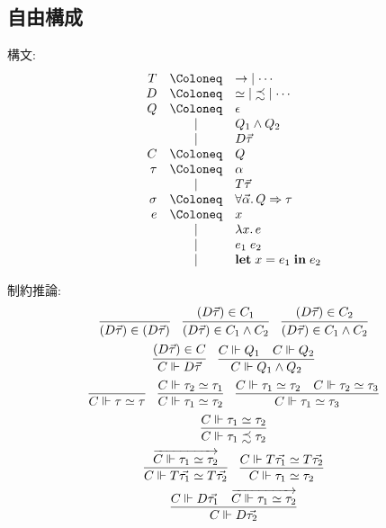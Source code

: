 \subsection{自由構成}

構文:
\begin{align*}
  \begin{array}{rcl}
    T
    &\Coloneq &{\to} \mid \cdots \\
    D
    &\Coloneq &{\simeq} \mid {\precsim} \mid \cdots \\
    Q
    &\Coloneq &\epsilon \\
    &\mid &Q_1 \land Q_2 \\
    &\mid &D \vec{\tau} \\
    C
    &\Coloneq &Q \\
    \tau
    &\Coloneq &\alpha \\
    &\mid &T \vec{\tau} \\
    \sigma
    &\Coloneq &\forall \vec{\alpha}\ldotp Q \Rightarrow \tau \\
    e
    &\Coloneq &x \\
    &\mid &\lambda x\ldotp e \\
    &\mid &e_1\; e_2 \\
    &\mid &\mathbf{let}\; x = e_1\; \mathbf{in}\; e_2
  \end{array}
\end{align*}

制約推論:
\begin{gather*}
  \infer{(D \vec{\tau}) \in (D \vec{\tau})}{}
  \hspace{1em}
  \infer{(D \vec{\tau}) \in C_1 \land C_2}{
    (D \vec{\tau}) \in C_1
  }
  \hspace{1em}
  \infer{(D \vec{\tau}) \in C_1 \land C_2}{
    (D \vec{\tau}) \in C_2
  }
  \\
  \infer{C \Vdash D \vec{\tau}}{(D \vec{\tau}) \in C}
  \hspace{1em}
  \infer{C \Vdash Q_1 \land Q_2}{C \Vdash Q_1 & C \Vdash Q_2}
  \\
  \infer{C \Vdash \tau \simeq \tau}{}
  \hspace{1em}
  \infer{C \Vdash \tau_1 \simeq \tau_2}{C \Vdash \tau_2 \simeq \tau_1}
  \hspace{1em}
  \infer{C \Vdash \tau_1 \simeq \tau_3}{C \Vdash \tau_1 \simeq \tau_2 & C \Vdash \tau_2 \simeq \tau_3}
  \\
  \infer{C \Vdash \tau_1 \precsim \tau_2}{
    C \Vdash \tau_1 \simeq \tau_2
  }
  \\
  \infer{C \Vdash T \vec{\tau_1} \simeq T \vec{\tau_2}}{\overrightarrow{C \Vdash \tau_1 \simeq \tau_2}}
  \hspace{1em}
  \infer{C \Vdash \tau_1 \simeq \tau_2}{C \Vdash T \vec{\tau_1} \simeq T \vec{\tau_2}}
  \\
  \infer{C \Vdash D \vec{\tau_2}}{
    C \Vdash D \vec{\tau_1}
    &
    \overrightarrow{C \Vdash \tau_1 \simeq \tau_2}
  }
\end{gather*}

